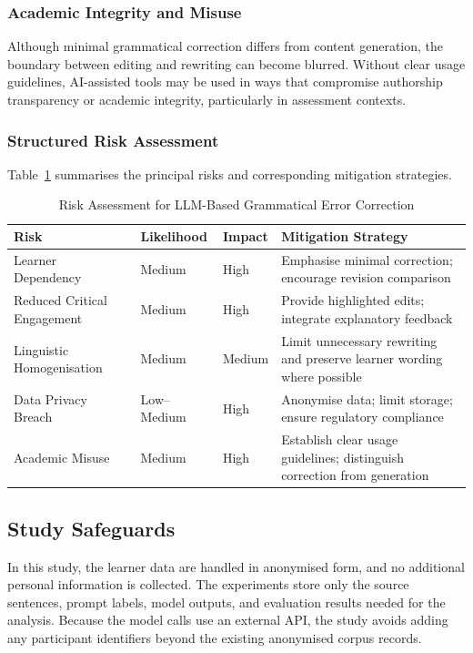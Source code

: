 \subsubsection{Academic Integrity and Misuse}

Although minimal grammatical correction differs from content generation, the boundary between editing and rewriting can become blurred. Without clear usage guidelines, AI-assisted tools may be used in ways that compromise authorship transparency or academic integrity, particularly in assessment contexts.

\subsubsection*{Structured Risk Assessment}

Table~\ref{tab:risk_assessment} summarises the principal risks and corresponding mitigation strategies.

\begin{table}[htbp]
\centering
\caption{Risk Assessment for LLM-Based Grammatical Error Correction}
\label{tab:risk_assessment}
\begin{tabular}{|p{4cm}|p{3cm}|p{3cm}|p{4cm}|}
\hline
\textbf{Risk} & \textbf{Likelihood} & \textbf{Impact} & \textbf{Mitigation Strategy} \\
\hline
Learner Dependency & Medium & High & Emphasise minimal correction; encourage revision comparison \\
\hline
Reduced Critical Engagement & Medium & High & Provide highlighted edits; integrate explanatory feedback \\
\hline
Linguistic Homogenisation & Medium & Medium & Limit unnecessary rewriting and preserve learner wording where possible \\
\hline
Data Privacy Breach & Low--Medium & High & Anonymise data; limit storage; ensure regulatory compliance \\
\hline
Academic Misuse & Medium & High & Establish clear usage guidelines; distinguish correction from generation \\
\hline
\end{tabular}
\end{table}

\subsection{Study Safeguards}

In this study, the learner data are handled in anonymised form, and no additional personal information is collected. The experiments store only the source sentences, prompt labels, model outputs, and evaluation results needed for the analysis. Because the model calls use an external API, the study avoids adding any participant identifiers beyond the existing anonymised corpus records.

